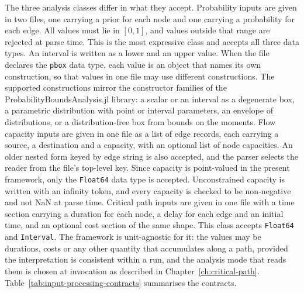 \documentclass[12pt]{report}
\begin{document}
The three analysis classes differ in what they accept. Probability inputs are given in two
files, one carrying a prior for each node and one carrying a probability for each edge. All
values must lie in $[0,1]$, and values outside that range are rejected at parse time. This is
the most expressive class and accepts all three data types. An interval is written as a
lower and an upper value. When the file declares the \texttt{pbox} data type, each value is an object that names
its own construction, so that values in one file may use different constructions. The
supported constructions mirror the constructor families of the ProbabilityBoundsAnalysis.jl
library: a scalar or an interval as a degenerate box, a parametric distribution with point or
interval parameters, an envelope of distributions, or a distribution-free box from bounds on
the moments. Flow capacity inputs are given in one file
as a list of edge records, each carrying a source, a destination and a capacity, with an
optional list of node capacities. An older nested form keyed by edge string is also accepted,
and the parser selects the reader from the file's top-level key. Since capacity is point-valued in the present framework,
only the \texttt{Float64} data type is accepted. Unconstrained capacity is written with an
infinity token, and every capacity is checked to be non-negative and not NaN at parse time.
Critical path inputs are given in one file with a time section carrying a duration for each
node, a delay for each edge and an initial time, and an optional cost section of the same
shape. This class accepts \texttt{Float64} and \texttt{Interval}. The framework is
unit-agnostic for it: the values may be durations, costs or any other quantity that
accumulates along a path, provided the interpretation is consistent within a run, and the
analysis mode that reads them is chosen at invocation as described in
Chapter~\ref{ch:critical-path}. Table~\ref{tab:input-processing-contracts} summarises the
contracts.
\end{document}
